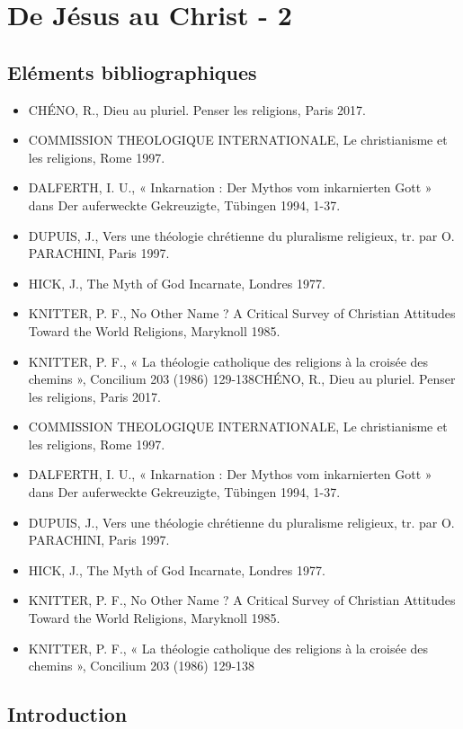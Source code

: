 \chapter{De Jésus au Christ - 2}
\section{Eléments bibliographiques}
\begin{itemize}
    \item CHÉNO, R., Dieu au pluriel. Penser les religions, Paris 2017.
    \item COMMISSION THEOLOGIQUE INTERNATIONALE, Le christianisme et les religions, Rome
1997.
    \item DALFERTH, I. U., « Inkarnation : Der Mythos vom inkarnierten Gott » dans Der auferweckte
Gekreuzigte, Tübingen 1994, 1-37.
    \item DUPUIS, J., Vers une théologie chrétienne du pluralisme religieux, tr. par O. PARACHINI,
Paris 1997.
  \item HICK, J., The Myth of God Incarnate, Londres 1977.
  \item KNITTER, P. F., No Other Name ? A Critical Survey of Christian Attitudes Toward the World
Religions, Maryknoll 1985.
  \item KNITTER, P. F., « La théologie catholique des religions à la croisée des chemins », Concilium
203 (1986) 129-138CHÉNO, R., Dieu au pluriel. Penser les religions, Paris 2017.
  \item COMMISSION THEOLOGIQUE INTERNATIONALE, Le christianisme et les religions, Rome
1997.
  \item DALFERTH, I. U., « Inkarnation : Der Mythos vom inkarnierten Gott » dans Der auferweckte
Gekreuzigte, Tübingen 1994, 1-37.
  \item DUPUIS, J., Vers une théologie chrétienne du pluralisme religieux, tr. par O. PARACHINI,
Paris 1997.
  \item HICK, J., The Myth of God Incarnate, Londres 1977.
  \item KNITTER, P. F., No Other Name ? A Critical Survey of Christian Attitudes Toward the World
Religions, Maryknoll 1985.
  \item KNITTER, P. F., « La théologie catholique des religions à la croisée des chemins », Concilium
203 (1986) 129-138
\end{itemize}

\section{Introduction}

